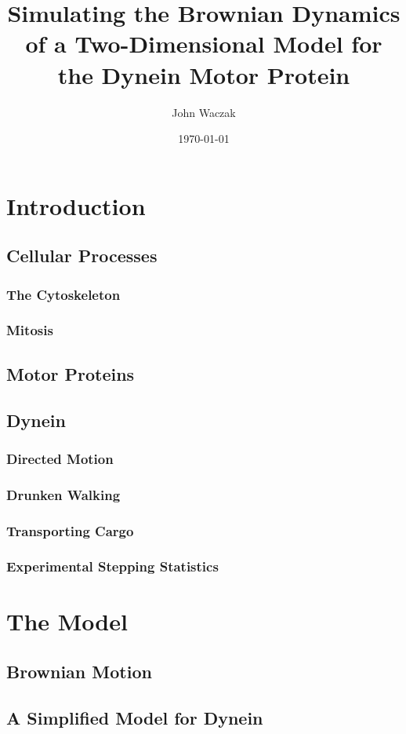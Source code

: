 \documentclass[a4paper, 11pt]{article}
\title{Simulating the Brownian Dynamics of a Two-Dimensional Model for the Dynein Motor Protein}
\author{John Waczak}
\date{\today}
\begin{document}
\maketitle
\newpage
\tableofcontents
\newpage

\section{Introduction}
	\subsection{Cellular Processes}
		\subsubsection{The Cytoskeleton}
		\subsubsection{Mitosis} 
	\subsection{Motor Proteins}
\subsection{Dynein}
	\subsubsection{Directed Motion}
	\subsubsection{Drunken Walking}
	\subsubsection{Transporting Cargo}
	\subsubsection{Experimental Stepping Statistics}


\section{The Model} 
	\subsection{Brownian Motion}
	\subsection{A Simplified Model for Dynein}
\end{document}
